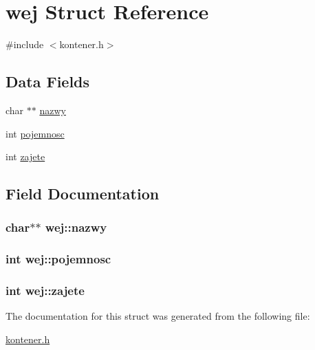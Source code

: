 \hypertarget{structwej}{}\section{wej Struct Reference}
\label{structwej}


{\ttfamily \#include $<$kontener.\+h$>$}

\subsection*{Data Fields}
\begin{DoxyCompactItemize}
\item 
char $\ast$$\ast$ \hyperlink{structwej_a17813178e5c51a2579158f02475e7b53}{nazwy}
\item 
int \hyperlink{structwej_a85d539acec77a0d78f3e3d2f4a0eba56}{pojemnosc}
\item 
int \hyperlink{structwej_a3b36a65cb0884363297483a1aba69f99}{zajete}
\end{DoxyCompactItemize}


\subsection{Field Documentation}
\hypertarget{structwej_a17813178e5c51a2579158f02475e7b53}{}
\subsubsection[{nazwy}]{\setlength{\rightskip}{0pt plus 5cm}char$\ast$$\ast$ wej\+::nazwy}\label{structwej_a17813178e5c51a2579158f02475e7b53}
\hypertarget{structwej_a85d539acec77a0d78f3e3d2f4a0eba56}{}
\subsubsection[{pojemnosc}]{\setlength{\rightskip}{0pt plus 5cm}int wej\+::pojemnosc}\label{structwej_a85d539acec77a0d78f3e3d2f4a0eba56}
\hypertarget{structwej_a3b36a65cb0884363297483a1aba69f99}{}
\subsubsection[{zajete}]{\setlength{\rightskip}{0pt plus 5cm}int wej\+::zajete}\label{structwej_a3b36a65cb0884363297483a1aba69f99}


The documentation for this struct was generated from the following file\+:\begin{DoxyCompactItemize}
\item 
\hyperlink{kontener_8h}{kontener.\+h}\end{DoxyCompactItemize}
